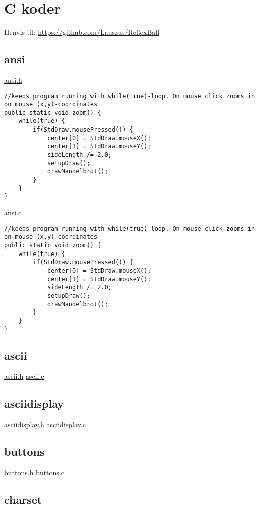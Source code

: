 \chapter{C koder}
Henvis til: \url{https://github.com/Lauszus/ReflexBall}

\section{ansi}
\label{ansi}

\underline{ansi.h}
\begin{lstlisting}
//keeps program running with while(true)-loop. On mouse click zooms in on mouse (x,y)-coordinates
public static void zoom() {
	while(true) {
		if(StdDraw.mousePressed()) {
			center[0] = StdDraw.mouseX();
			center[1] = StdDraw.mouseY();
			sideLength /= 2.0;
			setupDraw();
			drawMandelbrot();
		}
	}
}
\end{lstlisting}

\underline{ansi.c}
\begin{lstlisting}
//keeps program running with while(true)-loop. On mouse click zooms in on mouse (x,y)-coordinates
public static void zoom() {
	while(true) {
		if(StdDraw.mousePressed()) {
			center[0] = StdDraw.mouseX();
			center[1] = StdDraw.mouseY();
			sideLength /= 2.0;
			setupDraw();
			drawMandelbrot();
		}
	}
}
\end{lstlisting}


\section{ascii}
\label{ascii}

\underline{ascii.h}
\underline{ascii.c}

\section{asciidisplay}
\label{asciidisplay}

\underline{asciidisplay.h}
\underline{asciidisplay.c}

\section{buttons}
\label{buttons}

\underline{buttons.h}
\underline{buttons.c}

\section{charset}
\label{charset}

